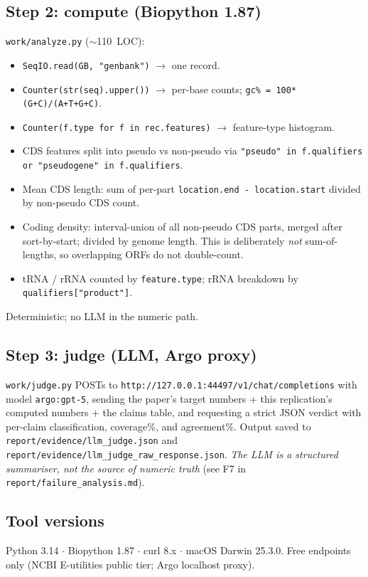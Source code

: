 \documentclass[10pt]{article}
\begin{document}
\subsection*{Step 2: compute (Biopython 1.87)}
\texttt{work/analyze.py} ($\sim$110~LOC):
\begin{itemize}[leftmargin=1.2em, itemsep=0pt]
  \item \texttt{SeqIO.read(GB, "genbank")} $\to$ one record.
  \item \texttt{Counter(str(seq).upper())} $\to$ per-base counts; \texttt{gc\% = 100*(G+C)/(A+T+G+C)}.
  \item \texttt{Counter(f.type for f in rec.features)} $\to$ feature-type histogram.
  \item CDS features split into pseudo vs non-pseudo via
    \texttt{"pseudo" in f.qualifiers or "pseudogene" in f.qualifiers}.
  \item Mean CDS length: sum of per-part \texttt{location.end - location.start} divided by
    non-pseudo CDS count.
  \item Coding density: interval-union of all non-pseudo CDS parts, merged after
    sort-by-start; divided by genome length. This is deliberately \emph{not} sum-of-lengths, so
    overlapping ORFs do not double-count.
  \item tRNA / rRNA counted by \texttt{feature.type}; rRNA breakdown by
    \texttt{qualifiers["product"]}.
\end{itemize}
Deterministic; no LLM in the numeric path.

\subsection*{Step 3: judge (LLM, Argo proxy)}
\texttt{work/judge.py} POSTs to \texttt{http://127.0.0.1:44497/v1/chat/completions} with model
\texttt{argo:gpt-5}, sending the paper's target numbers + this replication's computed numbers +
the claims table, and requesting a strict JSON verdict with per-claim classification, coverage\%,
and agreement\%. Output saved to \texttt{report/evidence/llm\_judge.json} and
\texttt{report/evidence/llm\_judge\_raw\_response.json}. \emph{The LLM is a structured
summariser, not the source of numeric truth} (see F7 in
\texttt{report/failure\_analysis.md}).

\subsection*{Tool versions}
Python 3.14 $\cdot$ Biopython 1.87 $\cdot$ curl 8.x $\cdot$ macOS Darwin 25.3.0.
Free endpoints only (NCBI E-utilities public tier; Argo localhost proxy).
\end{document}
